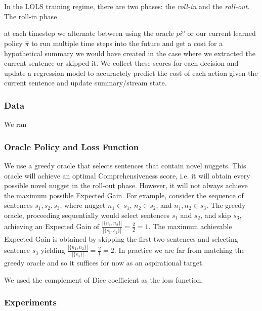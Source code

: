 ~\\

~\\

In the LOLS training regime, there are two phases: the 
\emph{roll-in} and the \emph{roll-out}. The roll-in phase 

at each timestep 
we alternate between using the oracle $pi^o$ or our current learned policy
$\hat{\pi}$ to run multiple time steps into the future and get a cost for 
a hypothetical summary we would have created in the case where we extracted the 
current sentence or skipped it. We collect these scores for each decision
and update a regression model to accuractely predict the cost of each action
given the current sentence and update summary/stream state.





\subsubsection{Data}
We ran 

\subsubsection{Oracle Policy and Loss Function}

We use a greedy oracle that selects sentences that contain novel
nuggets. This oracle will achieve an optimal Comprehensiveness score, i.e.
it will obtain every possible novel nugget in the roll-out phase.
However, it will not always achieve the maximum possible Expected Gain.
For example, consider the sequence of sentences $s_1, s_2, s_3$, where
nugget $n_1 \in s_1$, $n_2 \in s_2$, and $n_1,n_2 \in s_3$. The greedy oracle,
proceeding sequentially would select sentences $s_1$ and $s_2$, and skip
$s_3$, achieving an Expected Gain of $\frac{|\{n_1, n_2\}|}{|\{s_1, s_2 \}|} = \frac{2}{2} = 1$. The maximum achievable Expected Gain is obtained by skipping
the first two sentences and selecting sentence $s_3$ yielding $\frac{|\{n_1, n_2\}|}{|\{s_3 \}|} = \frac{2}{1} = 2$. In practice we are far from matching
the greedy oracle and so it suffices for now as an aspirational target.



We used the complement of Dice coefficient as the loss function.



\subsubsection{Experiments }

